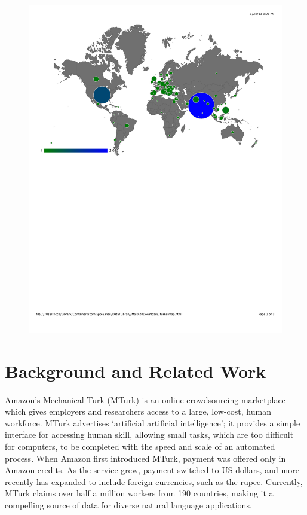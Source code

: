 \documentclass[11pt]{article}
\begin{document}
\begin{figure}[h]
\centering
\includegraphics[width=7in]{figures/turkermap}
\caption{}
\label{map}
\end{figure}

\section{Background and Related Work}
Amazon's Mechanical Turk (MTurk) is an online crowdsourcing marketplace which gives employers and researchers access to a large, low-cost, human workforce. MTurk advertises `artificial artificial intelligence'; it provides a simple interface for accessing human skill, allowing small tasks, which are too difficult for computers, to be completed with the speed and scale of an automated process. When Amazon first introduced MTurk, payment was offered only in Amazon credits. As the service grew, payment switched to US dollars, and more recently has expanded to include foreign currencies, such as the rupee. Currently, MTurk claims over half a million workers from 190 countries, making it a compelling source of data for diverse natural language applications.
\end{document}

